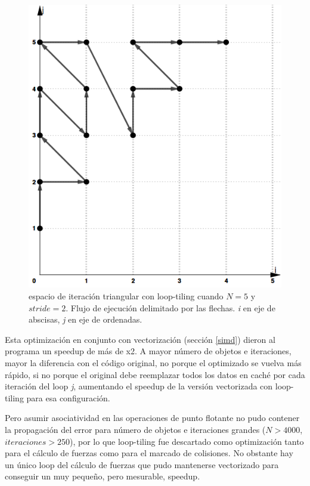 \documentclass{article}
\begin{document}
\begin{figure}[h!]
	\centering
	\includegraphics[width=0.5\linewidth,height=0.5\textwidth]{resources/loop_anidado_tiling_505x565.png}
	\caption{espacio de iteración triangular con loop-tiling cuando $N=5$ y $stride=2$. Flujo de ejecución
	delimitado por las flechas. \textit{i} en eje de abscisas, \textit{j} en eje de ordenadas.}
	\label{fig:no_tiling}
\end{figure}

Esta optimización en conjunto con vectorización (sección \ref{simd}) dieron al programa un speedup de más de x2.
A mayor número de objetos e iteraciones, mayor la diferencia con el código original, no porque el optimizado se
vuelva más rápido, si no porque el original debe reemplazar todos los datos en caché por cada iteración del loop \textit{j},
aumentando el speedup de la versión vectorizada con loop-tiling para esa configuración.


Pero asumir asociatividad en las operaciones de punto flotante no pudo contener la propagación del error
para número de objetos e iteraciones grandes ($N > 4000$, $iteraciones > 250$), por lo que loop-tiling fue descartado
como optimización tanto para el cálculo de fuerzas como para el marcado de colisiones. No obstante hay un único loop del cálculo de fuerzas que pudo mantenerse vectorizado para conseguir un muy pequeño, pero
mesurable, speedup.
\end{document}
